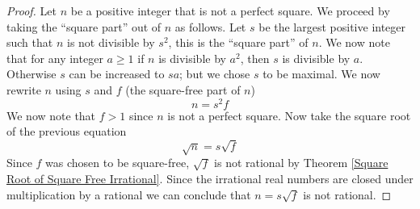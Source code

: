         \begin{proof}
            Let $n$ be a positive integer that is not a perfect square. We proceed by taking
            the ``square part'' out of $n$ as follows. Let $s$ be the largest positive integer
            such that $n$ is not divisible by $s^2$, this is the ``square part'' of $n$. We
            now note that for any integer $a \ge 1$ if $n$ is divisible by $a^2$, then
            $s$ is divisible by $a$. Otherwise $s$ can be increased to $sa$; but we chose $s$
            to be maximal. We now rewrite $n$ using $s$ and $f$ (the square-free part of $n$)
            \begin{equation}
                n = s^2 f
            \end{equation}
            We now note that $f > 1$ since $n$ is not a perfect square. Now take the square
            root of the previous equation
            \begin{equation}
                \sqrt{n} = s \sqrt{f}
            \end{equation}
            Since $f$ was chosen to be square-free, $\sqrt{f}$ is not rational by
            Theorem \ref{Square Root of Square Free Irrational}. Since the irrational real numbers
            are closed under multiplication by a rational we can conclude that $n = s \sqrt{f}$
            is not rational. \QED
        \end{proof}
